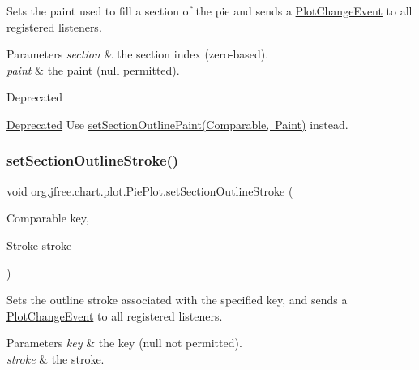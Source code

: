 Sets the paint used to fill a section of the pie and sends a \mbox{\hyperlink{}{Plot\+Change\+Event}} to all registered listeners.


\begin{DoxyParams}{Parameters}
{\em section} & the section index (zero-\/based). \\
\hline
{\em paint} & the paint ({\ttfamily null} permitted).\\
\hline
\end{DoxyParams}
\begin{DoxyRefDesc}{Deprecated}
\item[\mbox{\hyperlink{deprecated__deprecated000073}{Deprecated}}]Use \mbox{\hyperlink{classorg_1_1jfree_1_1chart_1_1plot_1_1_pie_plot_a07d24c6dfd9bde2ec5db77a1bed07506}{set\+Section\+Outline\+Paint(\+Comparable, Paint)}} instead. \end{DoxyRefDesc}
\mbox{\label{classorg_1_1jfree_1_1chart_1_1plot_1_1_pie_plot_acd082f96925c46a66807857e4314b9ae}} 
\subsubsection{\texorpdfstring{set\+Section\+Outline\+Stroke()}{setSectionOutlineStroke()}\hspace{0.1cm}{\footnotesize\ttfamily [1/3]}}
{\footnotesize\ttfamily void org.\+jfree.\+chart.\+plot.\+Pie\+Plot.\+set\+Section\+Outline\+Stroke (\begin{DoxyParamCaption}\item[{Comparable}]{key,  }\item[{Stroke}]{stroke }\end{DoxyParamCaption})}

Sets the outline stroke associated with the specified key, and sends a \mbox{\hyperlink{}{Plot\+Change\+Event}} to all registered listeners.


\begin{DoxyParams}{Parameters}
{\em key} & the key ({\ttfamily null} not permitted). \\
\hline
{\em stroke} & the stroke.\\
\hline
\end{DoxyParams}

